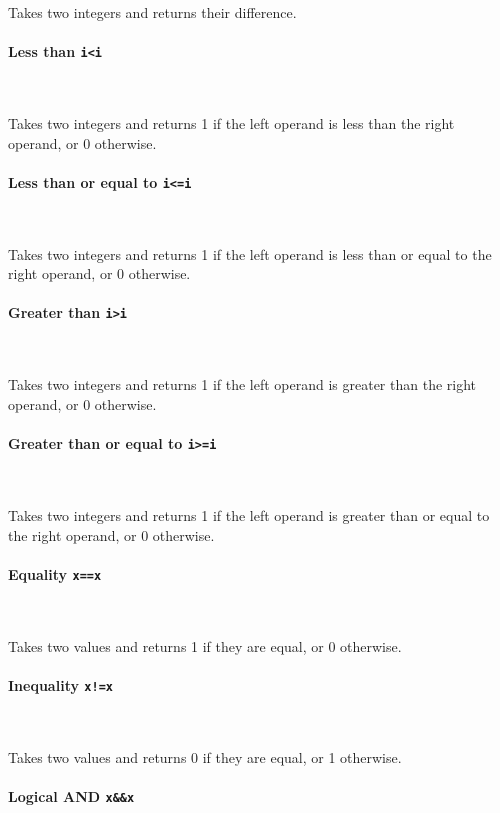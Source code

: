 Takes two integers and returns their difference.

\paragraph{Less than \quad \texttt{i<i}} \

Takes two integers and returns 1 if the left operand is less than the right operand, or 0 otherwise.

\paragraph{Less than or equal to \quad \texttt{i<=i}} \

Takes two integers and returns 1 if the left operand is less than or equal to the right operand, or 0 otherwise.

\paragraph{Greater than \quad \texttt{i>i}} \

Takes two integers and returns 1 if the left operand is greater than the right operand, or 0 otherwise.

\paragraph{Greater than or equal to \quad \texttt{i>=i}} \

Takes two integers and returns 1 if the left operand is greater than or equal to the right operand, or 0 otherwise.

\paragraph{Equality \quad \texttt{x==x}} \

Takes two values and returns 1 if they are equal, or 0 otherwise.

\paragraph{Inequality \quad \texttt{x!=x}} \

Takes two values and returns 0 if they are equal, or 1 otherwise.

\paragraph{Logical AND \quad \texttt{x\&\&x}} \

